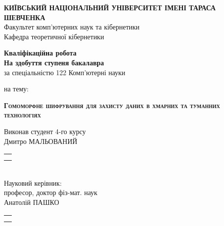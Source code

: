 \newcommand{\signature}{
{\footnotesize
\begin{tabular}{@{}p{1in}@{}}
    \hrulefill \\
    \vspace{-\baselineskip}
    \centering{(підпис)}
\end{tabular}}
}

\newpage
\begin{titlepage}
\begin{center}
\textbf{КИЇВСЬКИЙ НАЦІОНАЛЬНИЙ УНІВЕРСИТЕТ ІМЕНІ ТАРАСА ШЕВЧЕНКА}\\
Факультет комп’ютерних наук та кібернетики\\
Кафедра теоретичної кібернетики
\end{center}
\vspace{1em}
\begin{center}
\Large{\textbf{Кваліфікаційна робота}}\\
\normalsize{\textbf{На здобуття ступеня бакалавра}}\\
за спеціальністю 122 Комп’ютерні науки

\vspace{0.5em}
на тему:

\large{\textsc{\textbf{Гомоморфне шифрування для захисту даних в хмарних та туманних технологіях}}}
\end{center}
\vspace{1em}
\begin{flushleft}
Виконав студент 4-го курсу\\
Дмитро МАЛЬОВАНИЙ
\hspace{\fill}\signature\\
\vspace{0.5em}
Науковий керівник:\\
професор, доктор фіз-мат. наук\\
Анатолій ПАШКО
\hspace{\fill}\signature\\
\end{flushleft}


\end{titlepage}
